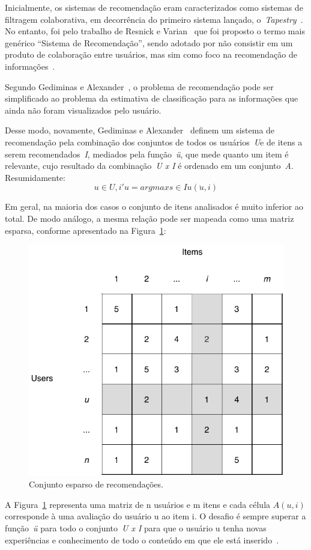 \documentclass{svproc}
\begin{document}
Inicialmente, os sistemas de recomendação eram caracterizados como sistemas de filtragem colaborativa, em decorrência do primeiro sistema lançado, o~\emph{Tapestry}~\cite{goldberg1992using,resnick1994grouplens,medeiros2013estudo}. 
No entanto, foi pelo trabalho de Resnick e Varian~\cite{resnick1997recommender} que foi proposto o termo mais genérico ``Sistema de Recomendação'', sendo adotado por
não consistir em um produto de colaboração entre usuários, mas sim como foco na recomendação de informações~\cite{adomavicius2005toward,medeiros2013estudo}.

Segundo Gediminas e Alexander~\cite{adomavicius2005toward}, o problema de recomendação pode ser simplificado ao
problema da estimativa de classificação para as informações que ainda não foram
visualizados pelo usuário.

Desse modo, novamente, Gediminas e Alexander~\cite{adomavicius2005toward} definem um sistema de recomendação pela combinação dos conjuntos de todos os usuários~\emph{U}e de itens a serem recomendados~\emph{I}, mediados pela função~\emph{ü}, que mede quanto um item é relevante, cujo resultado da combinação~\emph{U x I} é ordenado em um conjunto~\emph{A}.
Resumidamente: 
$$u \in U, i'u = argmaxs \in Iu(\ddot u, i)$$

Em geral, na maioria dos casos o conjunto de itens analisados é muito inferior ao total. 
De modo análogo, a mesma relação pode ser mapeada como uma matriz esparsa, conforme apresentado na Figura~\ref{figure:esparsa}:

\begin{figure}[!ht]
\centering
\includegraphics[width=.7\textwidth]{images/esparsa.pdf}
\caption{Conjunto esparso de recomendações.}
\label{figure:esparsa}
\end{figure}

A Figura~\ref{figure:esparsa} representa uma matriz de n usuários e m itens e cada célula $A(u,i)$ corresponde à uma avaliação do usuário u ao item i. 
O desafio é sempre superar a função~\emph{ü} para todo o conjunto~\emph{U x I} para que o usuário u tenha novas experiências e conhecimento de todo o conteúdo em que ele está inserido~\cite{adomavicius2005toward}.

%


%
\end{document}
